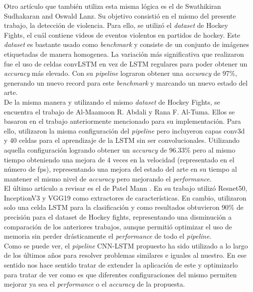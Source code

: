 Otro artículo que también utiliza esta misma lógica es el de
Swathikiran Sudhakaran and Oswald Lanz\cite{Sudhakaran2017}. Su objetivo consistió 
en el mismo del presente trabajo, la detección de violencia. 
Para ello, se utilizó el \textit{dataset} de Hockey Fights, 
el cuál contiene videos de eventos violentos en partidos de 
hockey. Este \textit{dataset} es bastante usado como \textit{benchmark} 
y consiste de un conjunto de imágenes etiquetadas de manera 
homogenea. La variación más significativa que realizaron fue el 
uso de celdas convLSTM en vez de LSTM regulares para poder 
obtener un \textit{accuracy} más elevado. Con su \textit{pipeline} 
lograron obtener una \textit{accuracy} de 97\%, generando un 
nuevo record para este \textit{benchmark} y marcando un nuevo 
estado del arte. \\


De la misma manera y utilizando el mismo \textit{dataset} de 
Hockey Fights, se encuentra el trabajo de Al-Maamoon R. Abdali 
y Rana F. Al-Tuma\cite{Abdali2019}. Ellos se basaron en el 
trabajo anteriormente mencionado para su implementación. 
Para ello, utilizaron la misma configuración del 
\textit{pipeline} pero incluyeron capas 
conv3d y 40 celdas para el aprendizaje de la LSTM sin ser 
convolucionales. Utilizando aquella configuración logrando 
obtener un \textit{accuracy} de 96.33\% 
pero al mismo tiempo obteniendo una mejora de 4 veces en la 
velocidad (representado en el número de fps), representando 
una mejora del estado del arte en su tiempo al mantener el 
mismo nivel de \textit{accuracy} pero mejorando el 
\textit{performance}.\\


El último artículo a revisar es el de Patel Mann 
\cite{Mann2021}. En su trabajo utilizó Resnet50, InceptionV3 
y VGG19 como extractores de características. En cambio, 
utilizaron solo una celda LSTM para la clasificación y como 
resultados obtuvieron 90\% de precisión para 
el dataset de Hockey fights, representando una disminución a 
comparación de los anteriores trabajos, aunque permitió optimizar 
el uso de memoria sin perder drásticamente el \textit{performance} 
de todo el \textit{pipeline}.\\

Como se puede ver, el \textit{pipeline} CNN-LSTM propuesto ha 
sido utilizado a lo largo de los últimos años para resolver 
problemas similares e iguales al nuestro. En ese sentido nos hace 
sentido tratar de extender la aplicación de este y optimizarlo 
para tratar de ver como es que diferentes configuraciones del 
mismo permiten mejorar ya sea el \textit{performance} o el 
\textit{accuracy} de la propuesta.


